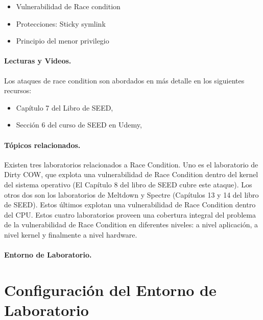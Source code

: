 \begin{itemize}[noitemsep]
\item Vulnerabilidad de Race condition
\item Protecciones: Sticky symlink
\item Principio del menor privilegio
\end{itemize}




\paragraph{Lecturas y Videos.}
Los ataques de race condition son abordados en más detalle en los siguientes recursos:

\begin{itemize}
\item Capítulo 7 del Libro de SEED, \seedbook
\item Sección 6 del curso de SEED en Udemy, \seedcsvideo
\end{itemize}


\paragraph{Tópicos relacionados.}
Existen tres laboratorios relacionados a Race Condition. Uno es el laboratorio de Dirty COW, que explota una vulnerabilidad de Race Condition dentro del kernel del sistema operativo (El Capítulo 8 del libro de SEED cubre este ataque). Los otros dos son los laboratorios de Meltdown y Spectre (Capítulos 13 y 14 del libro de SEED). Estos últimos explotan una vulnerabilidad de Race Condition dentro del CPU. Estos cuatro laboratorios proveen una cobertura integral del problema de la vulnerabilidad de Race Condition en diferentes niveles: a nivel aplicación, a nivel kernel y finalmente a nivel hardware.


\paragraph{Entorno de Laboratorio.} \seedenvironmentC


\section{Configuración del Entorno de Laboratorio}

